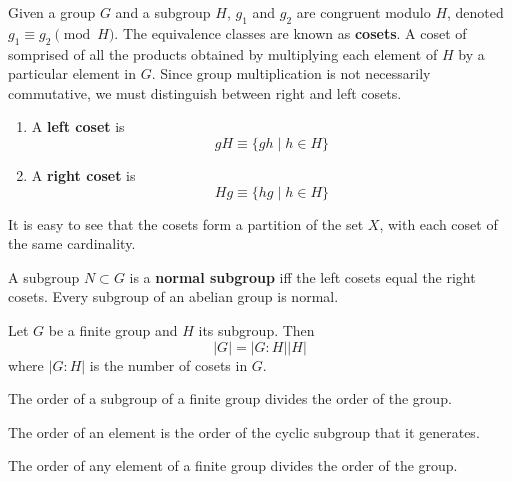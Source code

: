   \begin{definition}
    Given a group $G$ and a subgroup $H$, $g_1$ and $g_2$ are congruent modulo $H$, denoted $g_1 \equiv g_2 \pmod{H}$. The equivalence classes are known as \textbf{cosets}. A coset of somprised of all the products obtained by multiplying each element of $H$ by a particular element in $G$. Since group multiplication is not necessarily commutative, we must distinguish between right and left cosets. 
    \begin{enumerate}
      \item A \textbf{left coset} is 
        \begin{equation}
          g H \equiv \{g h \;| \;h \in H \} 
        \end{equation}
      \item A \textbf{right coset} is 
        \begin{equation}
          H g \equiv \{h g \;|\; h \in H \}
        \end{equation}
    \end{enumerate}
    It is easy to see that the cosets form a partition of the set $X$, with each coset of the same cardinality. 
  \end{definition}

  \begin{definition}
    A subgroup $N \subset G$ is a \textbf{normal subgroup} iff the left cosets equal the right cosets. Every subgroup of an abelian group is normal. 
  \end{definition}

  \begin{theorem}
    Let $G$ be a finite group and $H$ its subgroup. Then 
    \begin{equation}
      |G| = |G:H| |H|
    \end{equation}
    where $|G:H|$ is the number of cosets in $G$. 
  \end{theorem}

  \begin{corollary}
    The order of a subgroup of a finite group divides the order of the group. 
  \end{corollary}

  \begin{definition}
    The order of an element is the order of the cyclic subgroup that it generates. 
  \end{definition}

  \begin{corollary}
    The order of any element of a finite group divides the order of the group. 
  \end{corollary}

